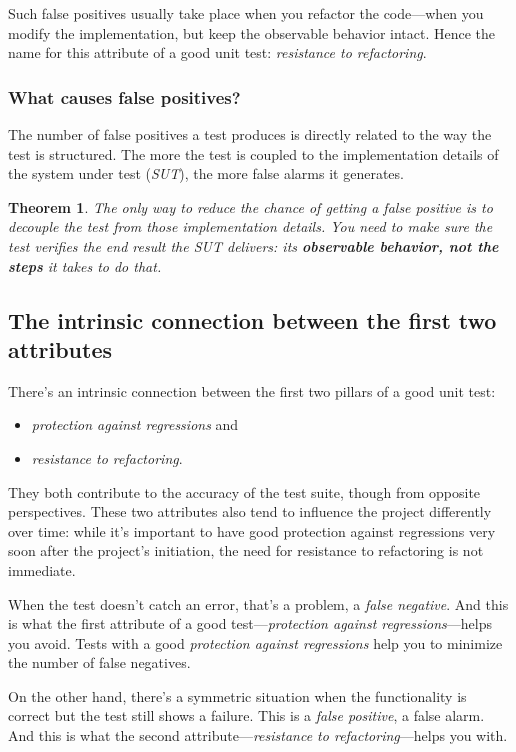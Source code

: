 \documentclass{article}
\newtheorem{theorem}{Theorem}
\begin{document}
Such false positives usually take place when you refactor the code—when you modify the implementation, but keep the observable behavior intact. Hence the name for this attribute of a good unit test: \textit{resistance to refactoring}.

\subsubsection{What causes false positives?}
The number of false positives a test produces is directly related to the way the test is structured. The more the test is coupled to the implementation details of the system under test (\textit{SUT}), the more false alarms it generates.  

\begin{theorem}
The only way to reduce the chance of getting a false positive is to decouple the test from those implementation details. You need to make sure the test verifies the end result the \textit{SUT} delivers: its \textbf{observable behavior, not the steps} it takes to do that.
\end{theorem}

\subsection{The intrinsic connection between the first two attributes}
There’s an intrinsic connection between the first two pillars of a good unit test:

\begin{itemize}
	\item \textit{protection against regressions} and 
	\item \textit{resistance to refactoring}.
\end{itemize}	

They both contribute to the accuracy of the test suite, though from opposite perspectives. These two attributes also tend to influence the project differently over time: while it’s important to have good protection against regressions very soon after the project’s initiation, the need for resistance to refactoring is not immediate.

When the test doesn’t catch an error, that’s a problem, a \textit{false negative}. And this is what the first attribute of a good test—\textit{protection against regressions}—helps you avoid. Tests with a good \textit{protection against regressions} help you to minimize the number of false negatives.

On the other hand, there’s a symmetric situation when the functionality is correct but the test still shows a failure. This is a \textit{false positive}, a false alarm. And this is what the second attribute—\textit{resistance to refactoring}—helps you with.
\end{document}
